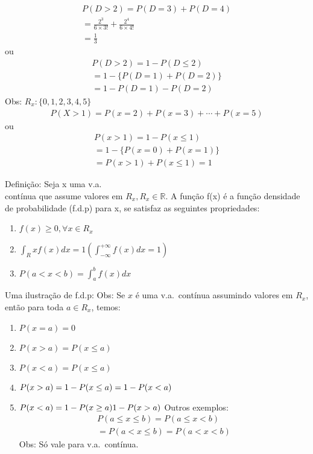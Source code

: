 \documentclass[11pt,a4paper]{book}
\begin{document}
\begin{enumerate}[label=(\alph*)]
\begin{enumerate}
\begin{enumerate}[label=(\alph*)]
\begin{align}
      P(D>2)=P(D=3)+P(D=4)\\
      =\frac{2^3}{6\times 3!}+ \frac{2^4}{6\times 4!}\\
      =\frac{1}{3}
    \end{align}
    ou 
    \begin{align}
      P(D>2)=1-P(D\le 2)\\
      = 1- \{ P(D=1)+ P(D=2) \}\\
      = 1- P(D=1)- P(D=2)
    \end{align}
    Obs: $R_{x}: \{0,1,2,3,4,5 \}$
    \begin{align}
      P(X>1)=P(x=2)+ P(x=3)+\cdots+P(x=5)
    \end{align}
    ou
    \begin{align}
      P(x>1)= 1-P(x\le 1)\\
      = 1- \{ P(x=0)+ P(x=1) \}\\
      = P(x>1)+ P(x\le 1)=1
    \end{align}
\end{enumerate}
Definição: Seja x uma v.a.\\ contínua que assume valores em $R_{x},R_{x} \in \mathbb{R}$.
A função f(x) é a função densidade de probabilidade (f.d.p) para x, se satisfaz as 
seguintes propriedades: 
\begin{enumerate} %
  \item $f(x)\geq 0, \forall x \in R_{x}$
  \item $\int_R{x} f(x) dx=1 (\int_{- \infty}^{+ \infty} f(x)dx=1)$
  \item $P(a<x<b)=\int^b_a f(x) dx $
\end{enumerate}
Uma ilustração de f.d.p: 
Obs: Se $x$ é uma v.a.\ contínua assumindo valores em $R_{x}$, então para toda 
$a \in R_{x}$, temos: 
\begin{enumerate}[label=(\alph*)]
  \item $P(x=a)=0$
  \item $P(x>a)=P(x\leq a)$
  \item $P(x<a)=P(x\le a)$
  \item $P(x>a)=1- P(x \le a)\\ = 1-P(x<a)$
  \item $P(x<a)=1-P(x \geq a)\\ 1-P(x>a)$
    Outros exemplos: 
    \begin{align}
      P(a\le x \le b)= P(a\le x < b)\\
      = P(a<x \le b)= P(a<x<b)
    \end{align}
    Obs: Só vale para v.a.\ contínua. 

\end{enumerate}
\end{enumerate}
\end{enumerate}
\end{document}
